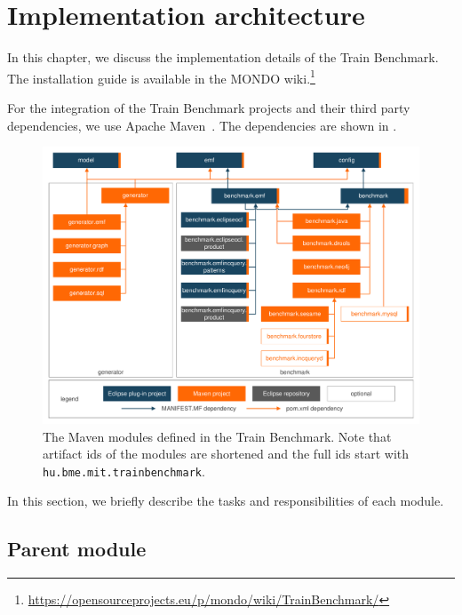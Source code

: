 \section{Implementation architecture}

In this chapter, we discuss the implementation details of the Train Benchmark. The installation guide is available in the MONDO wiki.\footnote{\url{https://opensourceprojects.eu/p/mondo/wiki/TrainBenchmark/}}


For the integration of the Train Benchmark projects and their third party dependencies, we use Apache Maven~\cite{Maven}. The dependencies are shown in .

\begin{figure}%
	\centering
	\includegraphics[width=\textwidth]{figures/trainbenchmark-modules}
	\caption{The Maven modules defined in the Train Benchmark. Note that artifact ids of the modules are shortened and the full ids start with \texttt{hu.bme.mit.trainbenchmark}.}
	\label{fig:trainbenchmark-modules}
\end{figure}

In this section, we briefly describe the tasks and responsibilities of each module.

\subsection{Parent module}

